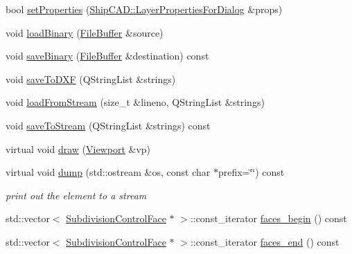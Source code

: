 \begin{DoxyCompactItemize}
\item 
bool \hyperlink{classShipCAD_1_1SubdivisionLayer_acee4a1fcdf3b2cbf3456ed3b81d66b8b}{set\+Properties} (\hyperlink{structShipCAD_1_1LayerPropertiesForDialog}{Ship\+C\+A\+D\+::\+Layer\+Properties\+For\+Dialog} \&props)
\item 
void \hyperlink{classShipCAD_1_1SubdivisionLayer_a060357b84c0549fa7310e45680fed9bd}{load\+Binary} (\hyperlink{classShipCAD_1_1FileBuffer}{File\+Buffer} \&source)
\item 
void \hyperlink{classShipCAD_1_1SubdivisionLayer_a48cbd23cf3d5492c4341cf9cd62214cd}{save\+Binary} (\hyperlink{classShipCAD_1_1FileBuffer}{File\+Buffer} \&destination) const 
\item 
void \hyperlink{classShipCAD_1_1SubdivisionLayer_ade79d45525e51e61ad4c8a790c7fd5b3}{save\+To\+D\+XF} (Q\+String\+List \&strings)
\item 
void \hyperlink{classShipCAD_1_1SubdivisionLayer_adf79f2412e399763bf1915d10f2f2a0a}{load\+From\+Stream} (size\+\_\+t \&lineno, Q\+String\+List \&strings)
\item 
void \hyperlink{classShipCAD_1_1SubdivisionLayer_af21e024f64ce46bfbcc668a093c54d4d}{save\+To\+Stream} (Q\+String\+List \&strings) const 
\item 
virtual void \hyperlink{classShipCAD_1_1SubdivisionLayer_a86f8600ffbf3973bc31c99bdb9e5b18d}{draw} (\hyperlink{classShipCAD_1_1Viewport}{Viewport} \&vp)
\item 
virtual void \hyperlink{classShipCAD_1_1SubdivisionLayer_ab41e005f720a2bba4b2efa74bfd5943e}{dump} (std\+::ostream \&os, const char $\ast$prefix=\char`\"{}\char`\"{}) const 
\begin{DoxyCompactList}\small\item\em print out the element to a stream \end{DoxyCompactList}\item 
std\+::vector$<$ \hyperlink{classShipCAD_1_1SubdivisionControlFace}{Subdivision\+Control\+Face} $\ast$ $>$\+::const\+\_\+iterator \hyperlink{classShipCAD_1_1SubdivisionLayer_a202a70b2862a0a1f1367ccba214d21dd}{faces\+\_\+begin} () const 
\item 
std\+::vector$<$ \hyperlink{classShipCAD_1_1SubdivisionControlFace}{Subdivision\+Control\+Face} $\ast$ $>$\+::const\+\_\+iterator \hyperlink{classShipCAD_1_1SubdivisionLayer_a5247d4b0cfc3b3c036d1de2b64381dc8}{faces\+\_\+end} () const 
\end{DoxyCompactItemize}
